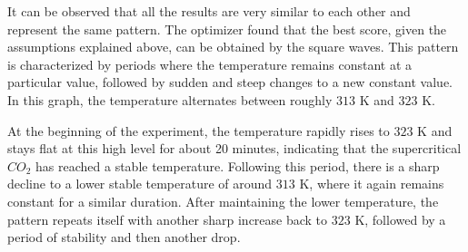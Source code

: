 \documentclass[]{scrartcl}
\begin{document}
It can be observed that all the results are very similar to each other and represent the same pattern. The optimizer found that the best score, given the assumptions explained above, can be obtained by the square waves. This pattern is characterized by periods where the temperature remains constant at a particular value, followed by sudden and steep changes to a new constant value. In this graph, the temperature alternates between roughly $313$ K and $323$ K.

At the beginning of the experiment, the temperature rapidly rises to $323$ K and stays flat at this high level for about 20 minutes, indicating that the supercritical $CO_2$ has reached a stable temperature. Following this period, there is a sharp decline to a lower stable temperature of around $313$ K, where it again remains constant for a similar duration. After maintaining the lower temperature, the pattern repeats itself with another sharp increase back to $323$ K, followed by a period of stability and then another drop.
\end{document}
